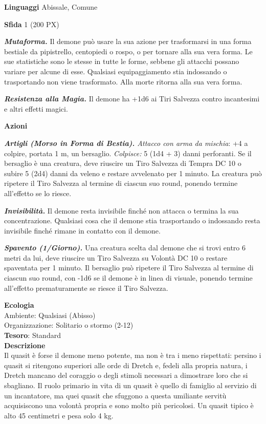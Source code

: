 \begin{multicols}{2}
	\textbf{Linguaggi} Abissale, Comune

	\textbf{Sfida} 1 (200 PX)

	\textit{\textbf{Mutaforma.}} Il demone può usare la sua azione per trasformarsi in una forma bestiale da pipistrello, centopiedi o rospo, o per tornare alla sua vera forma. Le sue statistiche sono le stesse in tutte le forme, sebbene gli attacchi possano variare per alcune di esse. Qualsiasi equipaggiamento stia indossando o trasportando non viene trasformato. Alla morte ritorna alla sua vera forma.

	\textit{\textbf{Resistenza alla Magia.}} Il demone ha +1d6 ai Tiri Salvezza contro incantesimi e altri effetti magici.

	\textbf{Azioni}

	\textit{\textbf{Artigli (Morso in Forma di Bestia).} Attacco con arma da mischia}: +4 a colpire, portata 1 m, un bersaglio. \textit{Colpisce:} 5 (1d4 + 3) danni perforanti. Se il bersaglio è una creatura, deve riuscire un Tiro Salvezza di Tempra DC 10 o subire 5 (2d4) danni da veleno e restare avvelenato per 1 minuto. La creatura può ripetere il Tiro Salvezza al termine di ciascun suo round, ponendo termine all'effetto se lo riesce.

	\textit{\textbf{Invisibilità.}} Il demone resta invisibile finché non attacca o termina la sua concentrazione. Qualsiasi cosa che il demone stia trasportando o indossando resta invisibile finché rimane in contatto con il demone.

	\textit{\textbf{Spavento (1/Giorno).}} Una creatura scelta dal demone che si trovi entro 6 metri da lui, deve riuscire un Tiro Salvezza su Volontà DC 10 o restare spaventata per 1 minuto. Il bersaglio può ripetere il Tiro Salvezza al termine di ciascun suo round, con -1d6 se il demone è in linea di visuale, ponendo termine all'effetto prematuramente se riesce il Tiro Salvezza.

	\textbf{Ecologia}\\
	Ambiente: Qualsiasi (Abisso)\\
	Organizzazione: Solitario o stormo (2-12)\\
	\textbf{Tesoro}: Standard\\
	\textbf{Descrizione}\\
	Il quasit è forse il demone meno potente, ma non è tra i meno rispettati: persino i quasit si ritengono superiori alle orde di Dretch e, fedeli alla propria natura, i Dretch mancano del coraggio o degli stimoli necessari a dimostrare loro che si sbagliano. Il ruolo primario in vita di un quasit è quello di famiglio al servizio di un incantatore, ma quei quasit che sfuggono a questa umiliante servitù acquisiscono una volontà propria e sono molto più pericolosi. Un quasit tipico è alto 45 centimetri e pesa solo 4 kg.


\end{multicols}
